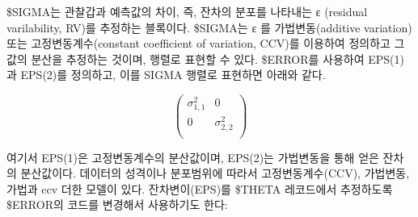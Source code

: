 \documentclass[
  10pt,
  krantz2,
  a4paper]{krantz}
\newenvironment{Shaded}{\begin{snugshade}}{\end{snugshade}}
\newcommand{\DecValTok}[1]{\textcolor[rgb]{0.00,0.00,0.81}{#1}}
\newcommand{\KeywordTok}[1]{\textcolor[rgb]{0.13,0.29,0.53}{\textbf{#1}}}
\newcommand{\NormalTok}[1]{#1}
\newcommand{\OperatorTok}[1]{\textcolor[rgb]{0.81,0.36,0.00}{\textbf{#1}}}
\newcommand{\StringTok}[1]{\textcolor[rgb]{0.31,0.60,0.02}{#1}}
\theoremstyle{definition}
\theoremstyle{definition}
\theoremstyle{definition}
\theoremstyle{remark}
\begin{document}
\$SIGMA는 관찰갑과 예측값의 차이, 즉, 잔차의 분포를 나타내는 ε (residual varilability, RV)를 추정하는 블록이다. \$SIGMA는 ε 를 가법변동(additive variation) 또는 고정변동계수(constant coefficient of variation, CCV)를 이용하여 정의하고 그 값의 분산을 추정하는 것이며, 행렬로 표현할 수 있다. \$ERROR를 사용하여 EPS(1)과 EPS(2)를 정의하고, 이를 SIGMA 행렬로 표현하면 아래와 같다.

\begin{Shaded}
\end{Shaded}

\begin{equation}
\begin{pmatrix} 
   \sigma_{1,1}^2 & 0 \\
   0 & \sigma_{2,2}^2 \\
\end{pmatrix}
\label{eq:ccv-equation}
\end{equation}

여기서 EPS(1)은 고정변동계수의 분산값이며, EPS(2)는 가법변동을 통해 얻은 잔차의 분산값이다. 데이터의 성격이나 분포범위에 따라서 고정변동계수(CCV), 가법변동, 가법과 ccv 더한 모델이 있다. 잔차변이(EPS)를 \$THETA 레코드에서 추정하도록 \$ERROR의 코드를 변경해서 사용하기도 한다:
\end{document}
